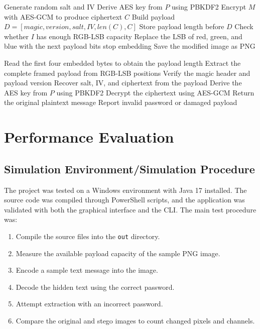 \documentclass[12pt]{report}
\begin{document}
\begin{algorithm}[H]
\DontPrintSemicolon
{}
Generate random salt and IV\;
Derive AES key from $P$ using PBKDF2\;
Encrypt $M$ with AES-GCM to produce ciphertext $C$\;
Build payload $D = [magic, version, salt, IV, len(C), C]$\;
Store payload length before $D$\;
Check whether $I$ has enough RGB-LSB capacity\;
{
    Replace the LSB of red, green, and blue with the next payload bits\;
    {
        stop embedding\;
    }
}
Save the modified image as PNG\;
\caption{Encoding algorithm}
\end{algorithm}

\begin{algorithm}[H]
\DontPrintSemicolon
{}
Read the first four embedded bytes to obtain the payload length\;
Extract the complete framed payload from RGB-LSB positions\;
Verify the magic header and payload version\;
Recover salt, IV, and ciphertext from the payload\;
Derive the AES key from $P$ using PBKDF2\;
Decrypt the ciphertext using AES-GCM\;
{
    Return the original plaintext message\;
}
\Else
{
    Report invalid password or damaged payload\;
}
\caption{Decoding algorithm}
\end{algorithm}

\newpage
\chapter{Performance Evaluation}

\section{Simulation Environment/Simulation Procedure}
The project was tested on a Windows environment with Java 17 installed. The source code was compiled through PowerShell scripts, and the application was validated with both the graphical interface and the CLI. The main test procedure was:
\begin{enumerate}
    \item Compile the source files into the \texttt{out} directory.
    \item Measure the available payload capacity of the sample PNG image.
    \item Encode a sample text message into the image.
    \item Decode the hidden text using the correct password.
    \item Attempt extraction with an incorrect password.
    \item Compare the original and stego images to count changed pixels and channels.
\end{enumerate}
\end{document}

